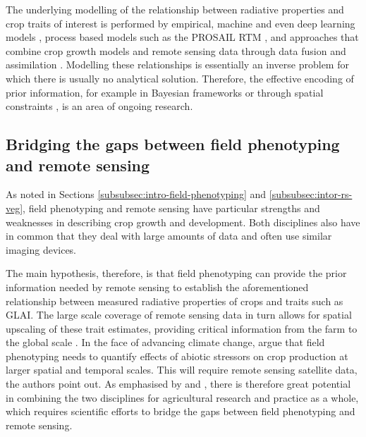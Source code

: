 The underlying modelling of the relationship between radiative properties and crop traits of interest is performed by empirical, machine and even deep learning models \citep{verrelst_quantifying_2019}, process based models such as the PROSAIL \gls{RTM} \citep{jacquemoud_prospectsail_2009}, and approaches that combine crop growth models and remote sensing data through data fusion and assimilation \citep{ma_wheat_2022}. Modelling these relationships is essentially an inverse problem for which there is usually no analytical solution. Therefore, the effective encoding of prior information, for example in Bayesian frameworks \citep{zhang_towards_2023} or through spatial constraints \citep{atzberger_spatially_2012}, is an area of ongoing research.

\subsection{Bridging the gaps between field phenotyping and remote sensing}
As noted in Sections \ref{subsubsec:intro-field-phenotyping} and \ref{subsubsec:intor-rs-veg}, field phenotyping and remote sensing have particular strengths and weaknesses in describing crop growth and development. Both disciplines also have in common that they deal with large amounts of data and often use similar imaging devices.

The main hypothesis, therefore, is that field phenotyping can provide the prior information needed by remote sensing to establish the aforementioned relationship between measured radiative properties of crops and traits such as \gls{GLAI}. The large scale coverage of remote sensing data in turn allows for spatial upscaling of these trait estimates, providing critical information from the farm to the global scale \citep{weiss_remote_2020}. In the face of advancing climate change, \cite{smith_scaling_2021} argue that field phenotyping needs to quantify effects of abiotic stressors on crop production at larger spatial and temporal scales. This will require remote sensing satellite data, the authors point out. As emphasised by \cite{machwitz_bridging_2021} and \cite{walter_advances_2022}, there is therefore great potential in combining the two disciplines for agricultural research and practice as a whole, which requires scientific efforts to bridge the gaps between field phenotyping and remote sensing.

